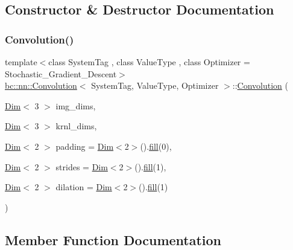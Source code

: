 \subsection{Constructor \& Destructor Documentation}
\mbox{\label{structbc_1_1nn_1_1Convolution_a597f57342a57ee7a76e48e2d55f8ec00}} 
\subsubsection{\texorpdfstring{Convolution()}{Convolution()}}
{\footnotesize\ttfamily template$<$class System\+Tag , class Value\+Type , class Optimizer  = Stochastic\+\_\+\+Gradient\+\_\+\+Descent$>$ \\
\hyperlink{structbc_1_1nn_1_1Convolution}{bc\+::nn\+::\+Convolution}$<$ System\+Tag, Value\+Type, Optimizer $>$\+::\hyperlink{structbc_1_1nn_1_1Convolution}{Convolution} (\begin{DoxyParamCaption}\item[{\hyperlink{structbc_1_1Dim}{Dim}$<$ 3 $>$}]{img\+\_\+dims,  }\item[{\hyperlink{structbc_1_1Dim}{Dim}$<$ 3 $>$}]{krnl\+\_\+dims,  }\item[{\hyperlink{structbc_1_1Dim}{Dim}$<$ 2 $>$}]{padding = {\ttfamily \hyperlink{structbc_1_1Dim}{Dim}$<$2$>$().\hyperlink{tensor__iteralgos_8h_afd10a40f252abd24d1faa2752becdd53}{fill}(0)},  }\item[{\hyperlink{structbc_1_1Dim}{Dim}$<$ 2 $>$}]{strides = {\ttfamily \hyperlink{structbc_1_1Dim}{Dim}$<$2$>$().\hyperlink{tensor__iteralgos_8h_afd10a40f252abd24d1faa2752becdd53}{fill}(1)},  }\item[{\hyperlink{structbc_1_1Dim}{Dim}$<$ 2 $>$}]{dilation = {\ttfamily \hyperlink{structbc_1_1Dim}{Dim}$<$2$>$().\hyperlink{tensor__iteralgos_8h_afd10a40f252abd24d1faa2752becdd53}{fill}(1)} }\end{DoxyParamCaption})\hspace{0.3cm}{\ttfamily [inline]}}



\subsection{Member Function Documentation}
\mbox{\label{structbc_1_1nn_1_1Convolution_afc07b8db150a19ecd72ad285009f6232}} 
